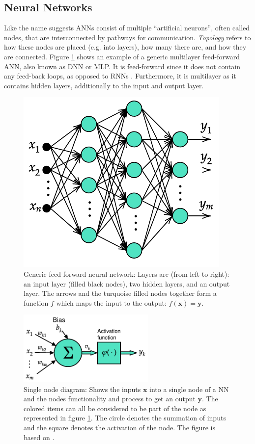 \documentclass[../main.tex]{subfiles}
\begin{document}
\subsection{Neural Networks}
\label{sec:A-NeuralNetworks}
Like the name suggests \acp{ANN} consist of multiple ``artificial neurons'', often called nodes, that are interconnected by pathways for communication.
\textit{Topology} refers to how these nodes are placed (e.g. into layers), how many there are, and how they are connected.
Figure \ref{fig:generic-ann} shows an example of a generic multilayer feed-forward \ac{ANN}, also known as \ac{DNN} or \ac{MLP}.
It is feed-forward since it does not contain any feed-back loops, as opposed to \acp{RNN} \cite{Goodfellow2016, Haykin2009}. 
Furthermore, it is multilayer as it contains hidden layers, additionally to the input and output layer.
\begin{figure}[ht!]
    \centering
    \includegraphics{img/generic-ann-diagram}
    \caption{Generic feed-forward neural network: Layers are (from left to right): an input layer (filled black nodes), two hidden layers, and an output layer. The arrows and the turquoise filled nodes together form a function $f$ which maps the input to the output: $f(\mathbf{x})=\mathbf{y} $.}
    \label{fig:generic-ann}
\end{figure}
\begin{figure}[ht!]
    \centering
    \includegraphics[width=0.6\textwidth]{img/node-diagram}
    \caption{Single node diagram: Shows the inputs $\mathbf{x}$ into a single node of a \ac{NN} and the nodes functionality and process to get an output $\mathbf{y}$. The colored items can all be considered to be part of the node as represented in figure \ref{fig:generic-ann}. The circle denotes the summation of inputs and the square denotes the activation of the node. The figure is based on \cite[Fig. 5]{Haykin2009}.}
    \label{fig:node-diagram}
\end{figure}
\end{document}
